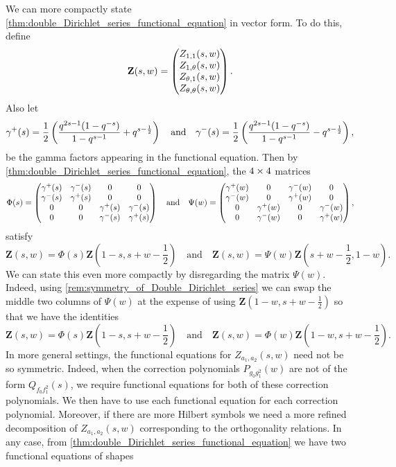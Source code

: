 \documentclass[12pt,reqno,oneside]{amsart}
\begin{document}
    We can more compactly state \cref{thm:double_Dirichlet_series_functional_equation} in vector form. To do this, define
    \[
        \mathbf{Z}(s,w) = \begin{pmatrix} Z_{1,1}(s,w) \\ Z_{1,\theta}(s,w) \\ Z_{\theta,1}(s,w) \\ Z_{\theta,\theta}(s,w) \end{pmatrix}.
    \]
    Also let
    \[
        \gamma^{+}(s) = \frac{1}{2}\left(\frac{q^{2s-1}(1-q^{-s})}{1-q^{s-1}}+q^{s-\frac{1}{2}}\right) \quad \text{and} \quad \gamma^{-}(s) = \frac{1}{2}\left(\frac{q^{2s-1}(1-q^{-s})}{1-q^{s-1}}-q^{s-\frac{1}{2}}\right),
    \]
    be the gamma factors appearing in the functional equation. Then by \cref{thm:double_Dirichlet_series_functional_equation}, the $4 \times 4$ matrices
    \[
        \Phi(s) = \begin{pmatrix} \gamma^{+}(s) & \gamma^{-}(s) & 0 & 0 \\ \gamma^{-}(s) & \gamma^{+}(s) & 0 & 0 \\ 0 & 0 & \gamma^{+}(s) & \gamma^{-}(s) \\ 0 & 0 & \gamma^{-}(s) & \gamma^{+}(s) \\ \end{pmatrix} \quad \text{and} \quad \Psi(w) = \begin{pmatrix} 
        \gamma^{+}(w) & 0 & \gamma^{-}(w) & 0 \\ 
        \gamma^{-}(w) & 0 & \gamma^{+}(w) & 0 \\ 
        0 & \gamma^{+}(w) & 0 & \gamma^{-}(w) \\ 
        0 & \gamma^{-}(w) & 0 & \gamma^{+}(w) \\ \end{pmatrix},
    \]
    satisfy
    \[
        \mathbf{Z}(s,w) = \Phi(s)\mathbf{Z}\left(1-s,s+w-\frac{1}{2}\right) \quad \text{and} \quad \mathbf{Z}(s,w) = \Psi(w)\mathbf{Z}\left(s+w-\frac{1}{2},1-w\right).
    \]
    We can state this even more compactly by disregarding the matrix $\Psi(w)$. Indeed, using \cref{rem:symmetry_of_Double_Dirichlet_series} we can swap the middle two columns of $\Psi(w)$ at the expense of using $\textbf{Z}\left(1-w,s+w-\frac{1}{2}\right)$ so that we have the identities
    \[
        \mathbf{Z}(s,w) = \Phi(s)\mathbf{Z}\left(1-s,s+w-\frac{1}{2}\right) \quad \text{and} \quad \mathbf{Z}(s,w) = \Phi(w)\mathbf{Z}\left(1-w,s+w-\frac{1}{2}\right).
    \]
    In more general settings, the functional equations for $Z_{a_{1},a_{2}}(s,w)$ need not be so symmetric. Indeed, when the correction polynomials $P_{g_{0}g_{1}^{2}}(w)$ are not of the form $Q_{f_{0}f_{1}^{2}}(s)$, we require functional equations for both of these correction polynomials. We then have to use each functional equation for each correction polynomial. Moreover, if there are more Hilbert symbols we need a more refined decomposition of $Z_{a_{1},a_{2}}(s,w)$ corresponding to the orthogonality relations. In any case, from \cref{thm:double_Dirichlet_series_functional_equation} we have two functional equations of shapes
\end{document}
